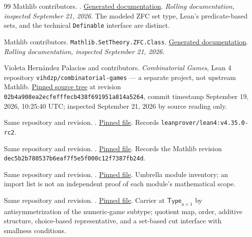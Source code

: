 \documentclass[11pt,letterpaper]{article}
\numberwithin{equation}{section}
\theoremstyle{definition}
\theoremstyle{remark}
\newcommand{\Type}{\mathsf{Type}}
\begin{document}
\begin{thebibliography}{99}
Mathlib contributors. .
\href{https://leanprover-community.github.io/mathlib4_docs/Mathlib/SetTheory/ZFC/Basic.html}{Generated documentation}.
\emph{Rolling documentation, inspected September 21, 2026.} The modeled ZFC set
type, Lean's predicate-based sets, and the technical \texttt{Definable}
interface are distinct.

Mathlib contributors. \texttt{Mathlib.SetTheory.ZFC.Class}.
\href{https://leanprover-community.github.io/mathlib4_docs/Mathlib/SetTheory/ZFC/Class.html}{Generated documentation}.
\emph{Rolling documentation, inspected September 21, 2026.}

Violeta Hern\'andez Palacios and contributors. \emph{Combinatorial Games}, Lean 4
repository \texttt{vihdzp/combinatorial-games} --- a separate project, not
upstream Mathlib.
\href{https://github.com/vihdzp/combinatorial-games/tree/02b4a908ea2ecfefffecb438f691951a814a5264}{Pinned source tree}
at revision \texttt{02b4a908ea2ecfefffecb438f691951a814a5264}, commit timestamp
September 19, 2026, 10:25:40 UTC; inspected September 21, 2026 by source reading
only.

Same repository and revision. .
\href{https://github.com/vihdzp/combinatorial-games/blob/02b4a908ea2ecfefffecb438f691951a814a5264/lean-toolchain}{Pinned file}.
Records \texttt{leanprover/lean4:v4.35.0-rc2}.

Same repository and revision. .
\href{https://github.com/vihdzp/combinatorial-games/blob/02b4a908ea2ecfefffecb438f691951a814a5264/lake-manifest.json}{Pinned file}.
Records the Mathlib revision
\texttt{dec5b2b780537b6eaf7f5e5f000c12f7387fb24d}.

Same repository and revision. .
\href{https://github.com/vihdzp/combinatorial-games/blob/02b4a908ea2ecfefffecb438f691951a814a5264/CombinatorialGames.lean}{Pinned file}.
Umbrella module inventory; an import list is not an independent proof of each
module's mathematical scope.

Same repository and revision. .
\href{https://github.com/vihdzp/combinatorial-games/blob/02b4a908ea2ecfefffecb438f691951a814a5264/CombinatorialGames/Surreal/Basic.lean}{Pinned file}.
Carrier at $\Type_{u+1}$ by antisymmetrization of the numeric-game subtype;
quotient map, order, additive structure, choice-based representative, and a
set-based cut interface with smallness conditions.


\end{thebibliography}
\end{document}
